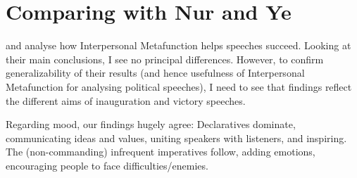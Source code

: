 \documentclass[11pt]{article}
\begin{document}
\section{Comparing with Nur and Ye}{
	\label{sec:comparison}
	\citeauthor{Nur} and \citeauthor{Ye} analyse how Interpersonal Metafunction helps speeches succeed.
	Looking at their main conclusions, I see no principal differences.
	However, to confirm generalizability of their results (and hence usefulness of Interpersonal Metafunction for analysing political speeches), I need to see that findings reflect the different aims of inauguration and victory speeches.

	
	Regarding mood, our findings hugely agree: Declaratives dominate, communicating ideas and values, uniting speakers with listeners, and inspiring. The (non-commanding) infrequent imperatives follow, adding emotions, encouraging people to face difficulties/enemies.

}
\end{document}
